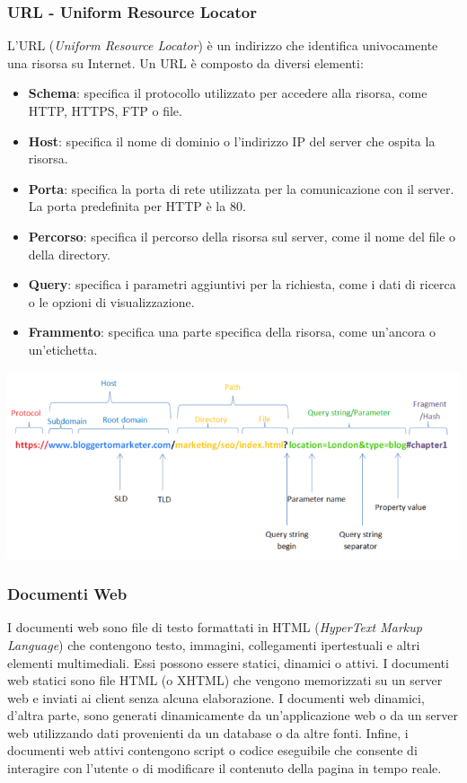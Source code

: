 \documentclass[12pt]{report}
\begin{document}
	\subsubsection{URL - Uniform Resource Locator}
	L'URL (\textit{Uniform Resource Locator}) è un indirizzo che identifica univocamente una risorsa su Internet. Un URL è composto da diversi elementi:
	\begin{itemize}
		\item \textbf{Schema}: specifica il protocollo utilizzato per accedere alla risorsa, come HTTP, HTTPS, FTP o file.
		\item \textbf{Host}: specifica il nome di dominio o l'indirizzo IP del server che ospita la risorsa.
		\item \textbf{Porta}: specifica la porta di rete utilizzata per la comunicazione con il server. La porta predefinita per HTTP è la 80.
		\item \textbf{Percorso}: specifica il percorso della risorsa sul server, come il nome del file o della directory.
		\item \textbf{Query}: specifica i parametri aggiuntivi per la richiesta, come i dati di ricerca o le opzioni di visualizzazione.
		\item \textbf{Frammento}: specifica una parte specifica della risorsa, come un'ancora o un'etichetta.
	\end{itemize}
	\begin{center}
		\includegraphics[scale=0.5]{assets/url.png}
	\end{center}

	\subsubsection{Documenti Web}
	I documenti web sono file di testo formattati in HTML (\textit{HyperText Markup Language}) che contengono testo, immagini, collegamenti ipertestuali e altri elementi multimediali. Essi possono essere statici, dinamici o attivi. I documenti web statici sono file HTML (o XHTML) che vengono memorizzati su un server web e inviati ai client senza alcuna elaborazione. I documenti web dinamici, d'altra parte, sono generati dinamicamente da un'applicazione web o da un server web utilizzando dati provenienti da un database o da altre fonti. Infine, i documenti web attivi contengono script o codice eseguibile che consente di interagire con l'utente o di modificare il contenuto della pagina in tempo reale.
\end{document}
